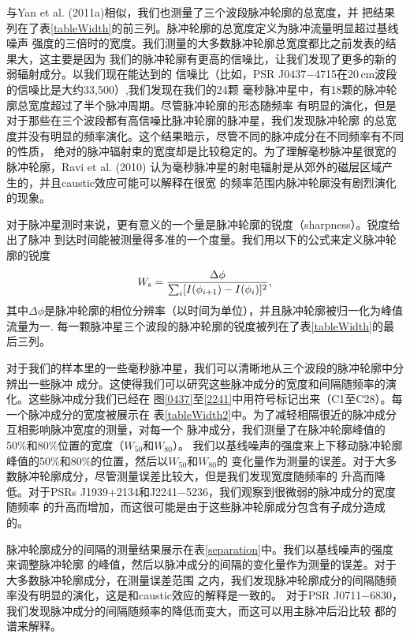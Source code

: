 与Yan et al. (2011a)\supercite{Yan11a}相似，我们也测量了三个波段脉冲轮廓的总宽度，并
把结果列在了表\ref{tableWidth}的前三列。脉冲轮廓的总宽度定义为脉冲流量明显超过基线噪声
强度的三倍时的宽度。我们测量的大多数脉冲轮廓总宽度都比之前发表的结果大，这主要是因为
我们的脉冲轮廓有更高的信噪比，让我们发现了更多的新的弱辐射成分。以我们现在能达到的
信噪比（比如，PSR J0437$-$4715在20\,cm波段的信噪比是大约33,500）,我们发现在我们的24颗
毫秒脉冲星中，有18颗的脉冲轮廓总宽度超过了半个脉冲周期。尽管脉冲轮廓的形态随频率
有明显的演化，但是对于那些在三个波段都有高信噪比脉冲轮廓的脉冲星，我们发现脉冲轮廓
的总宽度并没有明显的频率演化。这个结果暗示，尽管不同的脉冲成分在不同频率有不同的性质，
绝对的脉冲辐射束的宽度却是比较稳定的。为了理解毫秒脉冲星很宽的脉冲轮廓，Ravi et al. (2010)\supercite{Ravi10}
认为毫秒脉冲星的射电辐射是从郊外的磁层区域产生的，并且caustic效应可能可以解释在很宽
的频率范围内脉冲轮廓没有剧烈演化的现象。

对于脉冲星测时来说，更有意义的一个量是脉冲轮廓的锐度（sharpness）。锐度给出了脉冲
到达时间能被测量得多准的一个度量。我们用以下的公式来定义脉冲轮廓的锐度
%
\begin{equation}
W_{\rm{s}}=\frac{\Delta \phi}{\sum_{i}[I(\phi_{i+1})-I(\phi_{i})]^2},
\end{equation}
%
其中$\Delta \phi$是脉冲轮廓的相位分辨率（以时间为单位），并且脉冲轮廓被归一化为峰值流量为一\supercite{Cordes10,Shannon14}.
每一颗脉冲星三个波段的脉冲轮廓的锐度被列在了表\ref{tableWidth}的最后三列。

对于我们的样本里的一些毫秒脉冲星，我们可以清晰地从三个波段的脉冲轮廓中分辨出一些脉冲
成分。这使得我们可以研究这些脉冲成分的宽度和间隔随频率的演化。这些脉冲成分我们已经在
图\ref{0437}至\ref{2241}中用符号标记出来（C1至C28）。每一个脉冲成分的宽度被展示在
表\ref{tableWidth2}中。为了减轻相隔很近的脉冲成分互相影响脉冲宽度的测量，对每一个
脉冲成分，我们测量了在脉冲轮廓峰值的50\%和80\%位置的宽度（$W_{50}$和$W_{80}$）。
我们以基线噪声的强度来上下移动脉冲轮廓峰值的50\%和80\%的位置，然后以$W_{50}$和$W_{80}$的
变化量作为测量的误差。对于大多数脉冲轮廓成分，尽管测量误差比较大，但是我们发现宽度随频率的
升高而降低。对于PSRs J1939$+$2134和J2241$-$5236，我们观察到很微弱的脉冲成分的宽度随频率
的升高而增加，而这很可能是由于这些脉冲轮廓成分包含有子成分造成的。

脉冲轮廓成分的间隔的测量结果展示在表\ref{separation}中。我们以基线噪声的强度来调整脉冲轮廓
的峰值，然后以脉冲成分的间隔的变化量作为测量的误差。对于大多数脉冲轮廓成分，在测量误差范围
之内，我们发现脉冲轮廓成分的间隔随频率没有明显的演化，这是和caustic效应的解释是一致的。
对于PSR J0711$-$6830，我们发现脉冲成分的间隔随频率的降低而变大，而这可以用主脉冲后沿比较
都的谱来解释。

